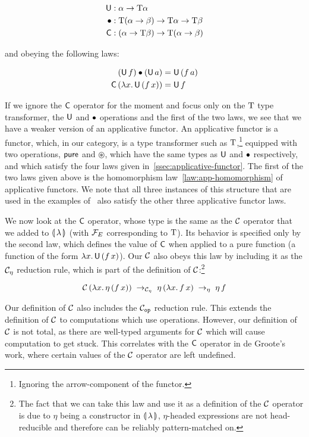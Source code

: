 \begin{align*}
  \mathsf{U} &: \alpha \to \text{T} \alpha \\
  \mathbin{\bullet} &: \text{T}(\alpha \to \beta) \to \text{T} \alpha \to \text{T} \beta \\
  \mathsf{C} &: (\alpha \to \text{T} \beta) \to \text{T} (\alpha \to \beta)
\end{align*}

and obeying the following laws:

\begin{align*}
  (\mathsf{U}\,f) \mathbin{\bullet} (\mathsf{U}\,a) &= \mathsf{U}\,(f\,a) \\
  \mathsf{C}\,(\lambda x.\, \mathsf{U}\,(f\,x)) &= \mathsf{U}\,f
\end{align*}

If we ignore the $\mathsf{C}$ operator for the moment and focus only on the $\text{T}$
type transformer, the $\mathsf{U}$ and $\mathbin{\bullet}$ operations and the first of the
two laws, we see that we have a weaker version of an applicative
functor. An applicative functor is a functor, which, in our category, is a
type transformer such as $\text{T}$,\footnote{Ignoring the arrow-component of
  the functor.} equipped with two operations, $\mathsf{pure}$ and $\circledast$,
which have the same types as $\mathsf{U}$ and $\mathbin{\bullet}$ respectively, and which
satisfy the four laws given in~\ref{ssec:applicative-functor}. The first of
the two laws given above is the homomorphism law~\ref{law:app-homomorphism}
of applicative functors. We note that all three instances of this structure
that are used in the examples of~\cite{degroote2015conservativity} also
satisfy the other three applicative functor laws.

We now look at the $\mathsf{C}$ operator, whose type is the same as the $\mathcal{C}$
operator that we added to ${\llparenthesis \, \lambda \, \rrparenthesis}$ (with $\mathcal{F}_E$ corresponding to
$\text{T}$). Its behavior is specified only by the second law, which defines the
value of $\mathsf{C}$ when applied to a pure function (a function of the form
$\lambda x.\, \mathsf{U}\,(f\,x)$). Our $\mathcal{C}$ also obeys this law by
including it as the $\mathcal{C}_\eta$ reduction rule, which is part of the
definition of $\mathcal{C}$:\footnote{The fact that we can take this law and use it
  as a definition of the $\mathcal{C}$ operator is due to $\eta$ being a
  constructor in ${\llparenthesis \, \lambda \, \rrparenthesis}$, $\eta$-headed expressions are not head-reducible
  and therefore can be reliably pattern-matched on.}

$$
\mathcal{C}\,(\lambda x.\, \eta\,(f\,x)) \; \to_{\mathcal{C}_\eta} \;
\eta\,(\lambda x.\, f\,x) \; \to_\eta \; \eta\,f
$$

Our definition of $\mathcal{C}$ also includes the $\mathcal{C}_{\mathtt{op}}$ reduction
rule. This extends the definition of $\mathcal{C}$ to computations which use
operations. However, our definition of $\mathcal{C}$ is not total, as there are
well-typed arguments for $\mathcal{C}$ which will cause computation to get
stuck. This correlates with the $\mathsf{C}$ operator in de Groote's work, where
certain values of the $\mathcal{C}$ operator are left undefined.

